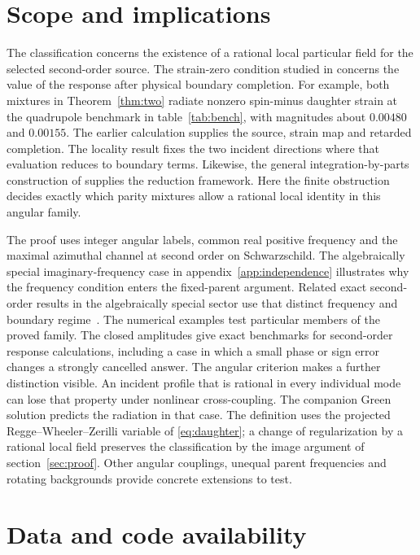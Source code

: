 \documentclass[11pt]{article}
\begin{document}


\section{Scope and implications}

The classification concerns the existence of a rational local particular field for the selected second-order source.
The strain-zero condition studied in \cite{bucciotti} concerns the value of the response after physical boundary completion.
For example, both mixtures in Theorem~\ref{thm:two} radiate nonzero spin-minus daughter strain at the quadrupole benchmark in table~\ref{tab:bench}, with magnitudes about \(0.00480\) and \(0.00155\).
The earlier calculation supplies the source, strain map and retarded completion. The locality result fixes the two incident directions where that evaluation reduces to boundary terms.
Likewise, the general integration-by-parts construction of \cite{chenxie} supplies the reduction framework. Here the finite obstruction decides exactly which parity mixtures allow a rational local identity in this angular family.

The proof uses integer angular labels, common real positive frequency and the maximal azimuthal channel at second order on Schwarzschild.
The algebraically special imaginary-frequency case in appendix~\ref{app:independence} illustrates why the frequency condition enters the fixed-parent argument.
Related exact second-order results in the algebraically special sector use that distinct frequency and boundary regime~\cite{special}.
The numerical examples test particular members of the proved family.
The closed amplitudes give exact benchmarks for second-order response calculations, including a case in which a small phase or sign error changes a strongly cancelled answer.
The angular criterion makes a further distinction visible. An incident profile that is rational in every individual mode can lose that property under nonlinear cross-coupling. The companion Green solution predicts the radiation in that case.
The definition uses the projected Regge--Wheeler--Zerilli variable of \eqref{eq:daughter}; a change of regularization by a rational local field preserves the classification by the image argument of section~\ref{sec:proof}.
Other angular couplings, unequal parent frequencies and rotating backgrounds provide concrete extensions to test.

\section*{Data and code availability}
\label{sec:data}
\end{document}
